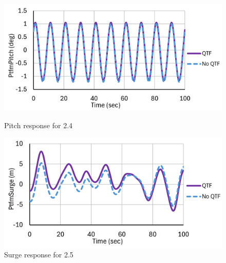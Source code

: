 \documentclass[a4paper, 11pt]{article}
\begin{document}
\begin{figure}[H]
    \begin{minipage}{0.49\textwidth}
        \centering
        \includegraphics[width=1\textwidth]{2.4_pitch.png}
        \caption{\small Pitch response for 2.4} 
        \label{fig:2.4_pitch}
    \end{minipage}
    \hfill
    \begin{minipage}{0.49\textwidth}
        \centering
        \vspace{-0.3cm}
        \includegraphics[width=1\textwidth]{2.5_surge.png}
        \caption{\small Surge response for 2.5}
        \label{fig:2.5_surge}
    \end{minipage}
\end{figure}
\end{document}
